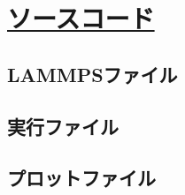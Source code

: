 \chapter{\href{https://github.com/m-agnet/Report.git}{ソースコード}}

\section{LAMMPSファイル}

\section{実行ファイル}

\section{プロットファイル}

